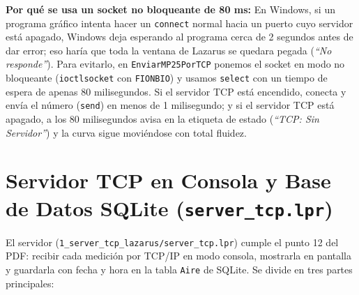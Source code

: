 \documentclass[11pt,a4paper]{article}
\begin{document}
\textbf{Por qué se usa un socket no bloqueante de 80 ms:} En Windows, si un programa gráfico intenta hacer un \texttt{connect} normal hacia un puerto cuyo servidor está apagado, Windows deja esperando al programa cerca de 2 segundos antes de dar error; eso haría que toda la ventana de Lazarus se quedara pegada (\emph{``No responde''}). Para evitarlo, en \texttt{EnviarMP25PorTCP} ponemos el socket en modo no bloqueante (\texttt{ioctlsocket} con \texttt{FIONBIO}) y usamos \texttt{select} con un tiempo de espera de apenas 80 milisegundos. Si el servidor TCP está encendido, conecta y envía el número (\texttt{send}) en menos de 1 milisegundo; y si el servidor TCP está apagado, a los 80 milisegundos avisa en la etiqueta de estado (\emph{``TCP: Sin Servidor''}) y la curva sigue moviéndose con total fluidez.

\section{Servidor TCP en Consola y Base de Datos SQLite (\texttt{server\_tcp.lpr})}

El servidor (\texttt{1\_server\_tcp\_lazarus/server\_tcp.lpr}) cumple el punto 12 del PDF: recibir cada medición por TCP/IP en modo consola, mostrarla en pantalla y guardarla con fecha y hora en la tabla \texttt{Aire} de SQLite. Se divide en tres partes principales:
\end{document}
